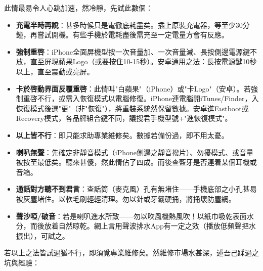 
此情最易令人心跳加速，然冷靜，先試此數個：

\begin{itemize}
  \item \textbf{充電半時再說}：甚多時候只是電徹底耗盡矣。插上原裝充電器，等至少30分鐘，再嘗試開機。有些手機於電耗盡後需充至一定電量方會有反應。
  \item \textbf{強制重啓}：iPhone全面屏機型按一次音量加、一次音量減、長按側邊電源鍵不放，直至屏現蘋果Logo（或要按住10-15秒）。安卓通用之法：長按電源鍵10秒以上，直至震動或亮屏。
  \item \textbf{卡於啓動界面反覆重啓}：此情叫"白蘋果"（iPhone）或"卡Logo"（安卓）。若強制重啓不行，或需入恢復模式以電腦修復。iPhone連電腦開iTunes/Finder，入恢復模式後選"更"（非"恢復"），將重裝系統然保留數據。安卓進Fastboot或Recovery模式，各品牌組合鍵不同，議搜君手機型號+"進恢復模式"。
  \item \textbf{以上皆不行}：即只能求助專業維修矣。數據若備份過，即不用太憂。
\end{itemize}


\begin{itemize}
  \item \textbf{喇叭無聲}：先確定非靜音模式（iPhone側邊之靜音撥片）、勿擾模式、或音量被按至最低矣。聽來甚傻，然此情佔了四成。而後查藍牙是否連着某個耳機或音箱。
  \item \textbf{通話對方聽不到君言}：查話筒（麥克風）孔有無堵住——手機底部之小孔甚易被灰塵堵住。以軟毛刷輕輕清理。勿以針或牙籤硬捅，將捅壞防塵網。
  \item \textbf{聲沙啞/破音}：若是喇叭進水所致——勿以吹風機熱風吹！以紙巾吸乾表面水分，而後放着自然晾乾。網上言用聲波排水App有一定之效（播放低頻聲把水振出），可試之。
\end{itemize}


若以上之法皆試過猶不行，即須覓專業維修矣。然維修市場水甚深，述吾己踩過之坑與經驗：

